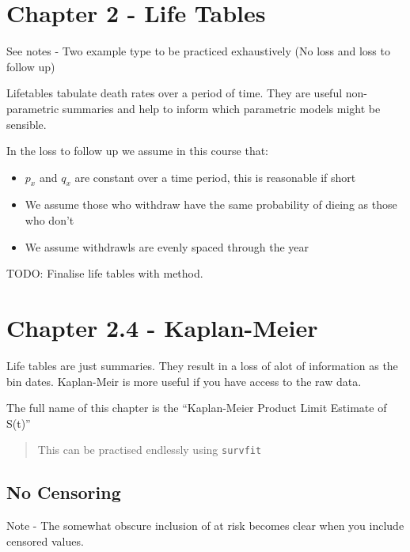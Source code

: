 \documentclass[
  letterpaper,
  DIV=11,
  numbers=noendperiod]{scrreprt}
\providecommand{\tightlist}{%
  \setlength{\itemsep}{0pt}\setlength{\parskip}{0pt}}\usepackage{longtable,booktabs,array}
\begin{document}
\hypertarget{chapter-2---life-tables}{%
\section{Chapter 2 - Life Tables}\label{chapter-2---life-tables}}

See notes - Two example type to be practiced exhaustively (No loss and
loss to follow up)

Lifetables tabulate death rates over a period of time. They are useful
non-parametric summaries and help to inform which parametric models
might be sensible.

In the loss to follow up we assume in this course that:

\begin{itemize}
\tightlist
\item
  \(p_x\) and \(q_x\) are constant over a time period, this is
  reasonable if short
\item
  We assume those who withdraw have the same probability of dieing as
  those who don't
\item
  We assume withdrawls are evenly spaced through the year
\end{itemize}

TODO: Finalise life tables with method.

\hypertarget{chapter-2.4---kaplan-meier}{%
\section{Chapter 2.4 - Kaplan-Meier}\label{chapter-2.4---kaplan-meier}}

Life tables are just summaries. They result in a loss of alot of
information as the bin dates. Kaplan-Meir is more useful if you have
access to the raw data.

The full name of this chapter is the ``Kaplan-Meier Product Limit
Estimate of S(t)''

\begin{quote}
This can be practised endlessly using \texttt{survfit}
\end{quote}

\hypertarget{no-censoring}{%
\subsection{No Censoring}\label{no-censoring}}

Note - The somewhat obscure inclusion of at risk becomes clear when you
include censored values.
\end{document}
